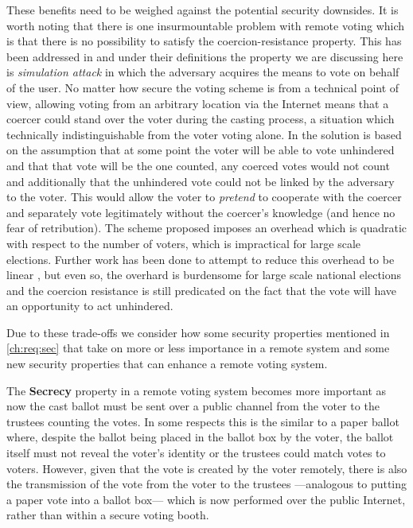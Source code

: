 These benefits need to be weighed against the potential security downsides. It is worth noting that there is one insurmountable problem with remote voting which is that there is no possibility to satisfy the coercion-resistance property. This has been addressed in \cite{juelsCoercionResistantElectronicElections2002} and under their definitions the property we are discussing here is \emph{simulation attack} in which the adversary acquires the means to vote on behalf of the user. No matter how secure the voting scheme is from a technical point of view, allowing voting from an arbitrary location via the Internet means that a coercer could stand over the voter during the casting process, a situation which technically indistinguishable from the voter voting alone. In \cite{juelsCoercionResistantElectronicElections2002} the solution is based on the assumption that at some point the voter will be able to vote unhindered and that that vote will be the one counted, any coerced votes would not count and additionally that the unhindered vote could not be linked by the adversary to the voter. This would allow the voter to \emph{pretend} to cooperate with the coercer and separately vote legitimately without the coercer's knowledge (and hence no fear of retribution). The scheme proposed imposes an overhead which is quadratic with respect to the number of voters, which is impractical for large scale elections. Further work has been done to attempt to reduce this overhead to be linear \cite{weberCoercionResistantElectronicElections2007a}, but even so, the overhard is burdensome for large scale national elections and the coercion resistance is still predicated on the fact that the vote will have an opportunity to act unhindered.

Due to these trade-offs we consider how some security properties mentioned in \autoref{ch:req:sec} that take on more or less importance in a remote system and some new security properties that can enhance a remote voting system.

The \textbf{Secrecy} property in a remote voting system becomes more important as now the cast ballot must be sent over a public channel from the voter to the trustees counting the votes. In some respects this is the similar to a paper ballot where, despite the ballot being placed in the ballot box by the voter, the ballot itself must not reveal the voter's identity or the trustees could match votes to voters. However, given that the vote is created by the voter remotely, there is also the transmission of the vote from the voter to the trustees ---analogous to putting a paper vote into a ballot box--- which is now performed over the public Internet, rather than within a secure voting booth.

